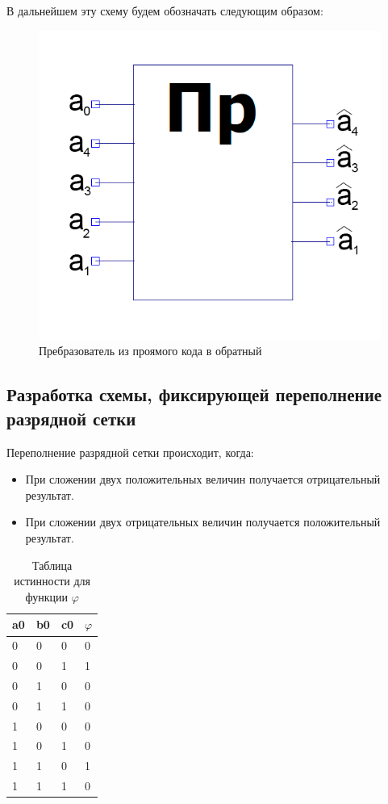 \documentclass[a4paper,14pt]{article}
\begin{document}
В дальнейшем эту схему будем обозначать следующим образом:

\begin{figure}[H]
	\centering
	\includegraphics[width=0.4\linewidth]{images/preobr_el}
	\caption{Пребразователь из проямого кода в обратный}
	\label{fig:preobr_el}
\end{figure}

\subsection{Разработка схемы, фиксирующей переполнение разрядной сетки}

Переполнение разрядной сетки происходит, когда:
\begin{itemize}
	\item При сложении двух положительных величин получается отрицательный результат.
	
	\item При сложении двух отрицательных величин получается положительный результат.	
\end{itemize}

\begin{table}[H]
	\begin{center}
		\caption{\label{tab:perSet} Таблица истинности для функции $\varphi$}
		
	\begin{tabular}{|l|l|l|l|}
		\hline
		a0 & b0 & c0 & $\varphi$ \\ \hline
		0  & 0  & 0  & 0  \\ \hline
		0  & 0  & 1  & 1  \\ \hline
		0  & 1  & 0  & 0  \\ \hline
		0  & 1  & 1  & 0  \\ \hline
		1  & 0  & 0  & 0  \\ \hline
		1  & 0  & 1  & 0  \\ \hline
		1  & 1  & 0  & 1  \\ \hline
		1  & 1  & 1  & 0  \\ \hline
	\end{tabular}
\end{center}
\end{table}
\end{document}
